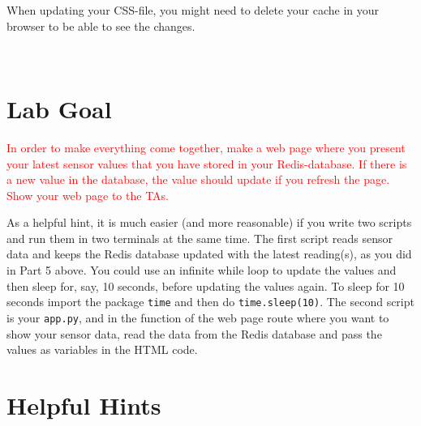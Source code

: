 \documentclass{article}
\begin{document}
\parbox[t]{14cm}{When updating your CSS-file, you might need to delete your cache in your browser to be able to see the changes.}\\



\section{Lab Goal}
\textcolor{red}{In order to make everything come together, make a web page where you present your latest sensor values that you have stored in your Redis-database. If there is a new value in the database, the value should update if you refresh the page. Show your web page to the TAs.}

As a helpful hint, it is much easier (and more reasonable) if you write two scripts and run them in two terminals at the same time. The first script reads sensor data and keeps the Redis database updated with the latest reading(s), as you did in Part 5 above. You could use an infinite while loop to update the values and then sleep for, say, 10 seconds, before updating the values again. To sleep for 10 seconds import the package \texttt{time} and then do \texttt{time.sleep(10)}. The second script is your \verb!app.py!, and in the function of the web page route where you want to show your sensor data, read the data from the Redis database and pass the values as variables in the HTML code.






\section{Helpful Hints}
\end{document}
